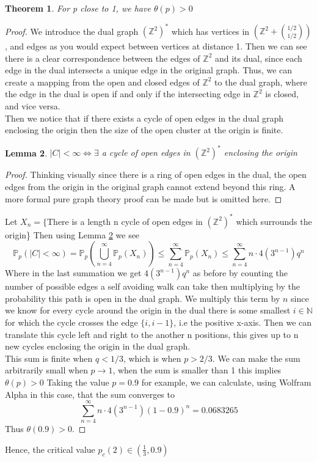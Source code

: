 \documentclass[a4paper,11pt]{article}
\newtheorem{theorem}{Theorem}[section]
\newtheorem{lemma}[theorem]{Lemma}
\theoremstyle{definition}
\newcommand{\ints}{\mathbb{Z}}
\newcommand{\ztwodual}{(\ints^2)^*}
\newcommand{\prob}{\mathbb{P}_p}
\begin{document}
\begin{theorem}
	For p close to 1, we have $\theta(p) > 0$
\end{theorem}
\begin{proof}
	We introduce the dual graph $(\ints^2)^*$ which has vertices in $(\ints^2 + \binom{1/2}{1/2} )$, and edges as you would expect between vertices at distance 1.
	Then we can see there is a clear correspondence between the edges of $\ints^2$ and its dual, since each edge in the dual intersects a unique edge in the original graph. 
	Thus, we can create a mapping from the open and closed edges of $\ints^2$ to the dual graph, where the edge in the dual is open if and only if the intersecting edge in $\ints^2$ is closed, and vice versa.\\
	Then we notice that if there exists a cycle of open edges in the dual graph enclosing the origin then the size of the open cluster at the origin is finite. 
	\begin{lemma}\label{originloop}
		$|C| < \infty \iff \exists$ a cycle of open edges in $(\ints^2)^*$  enclosing the origin
	\end{lemma}
	\begin{proof}
		{Thinking visually since there is a ring of open edges in the dual, the open edges from the origin in the original graph cannot extend beyond this ring. A more formal pure graph theory proof can be made but is omitted here.}
	\end{proof}
	Let $X_n = \{$There is a length n cycle of open edges in $\ztwodual$ which surrounds the origin\}
	Then using Lemma \ref{originloop} we see
	$$\prob(|C| < \infty) = \prob(\bigcup_{n=4}^\infty \prob(X_n)) \leq \sum_{n=4}^\infty \prob(X_n) \leq \sum_{n=4}^\infty n \cdot 4(3^{n-1})q^n$$
	Where in the last summation we get $4(3^{n-1})q^n$ as before by counting the number of possible edges a self avoiding walk can take then multiplying by the probability this path is open in the dual graph. 
	We multiply this term by $n$ since we know for every cycle around the origin in the dual there is some smallest $i \in \mathbb{N}$ for which the cycle crosses the edge $\{i,i-1\}$, i.e the positive x-axis. 
	Then we can translate this cycle left and right to the another n positions, this gives up to n new cycles enclosing the origin in the dual graph.\\
	This sum is finite when $q<1/3$, which is when $p>2/3$. 
	We can make the sum arbitrarily small when $p \rightarrow 1$, when the sum is smaller than 1 this implies $\theta(p) > 0$
	Taking the value $p=0.9$ for example, we can calculate, using Wolfram Alpha in this case, that the sum converges to 
	$$\sum_{n=4}^\infty n \cdot 4(3^{n-1})(1-0.9)^n = 0.0683265$$
	Thus $\theta(0.9) > 0$.

\end{proof}
Hence, the critical value $p_c(2) \in (\frac{1}{3},0.9)$
\end{document}

